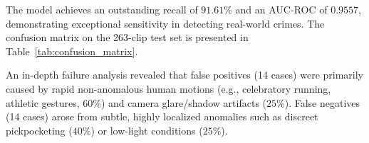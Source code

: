 \documentclass[12pt,a4paper]{report}
\begin{document}
\begin{table}[H]
    \centering
    \caption{Anomaly Detection Quantitative Test Results on UCF-Crime.}
    \label{tab:anomaly_results}
\end{table}

The model achieves an outstanding recall of $91.61\%$ and an AUC-ROC of $0.9557$, demonstrating exceptional sensitivity in detecting real-world crimes. The confusion matrix on the 263-clip test set is presented in Table~\ref{tab:confusion_matrix}.

\begin{table}[H]
    \centering
    \caption{Confusion Matrix on UCF-Crime Test Set (263 Clips).}
    \label{tab:confusion_matrix}
\end{table}

An in-depth failure analysis revealed that false positives (14 cases) were primarily caused by rapid non-anomalous human motions (e.g., celebratory running, athletic gestures, $60\%$) and camera glare/shadow artifacts ($25\%$). False negatives (14 cases) arose from subtle, highly localized anomalies such as discreet pickpocketing ($40\%$) or low-light conditions ($25\%$).
\end{document}
